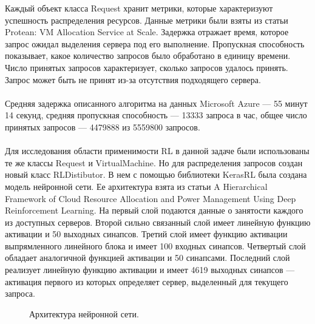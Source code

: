 \documentclass{article}
\begin{document}
Каждый объект класса Request хранит метрики, которые характеризуют успешность распределения ресурсов. Данные метрики были взяты из статьи Protean: VM Allocation Service at Scale\cite{litlink21}. Задержка отражает время, которое запрос ожидал выделения сервера под его выполнение. Пропускная способность показывает, какое количество запросов было обработано в единицу времени. Число принятых запросов характеризует, сколько запросов удалось принять. Запрос может быть не принят из-за отсутствия подходящего сервера.\\
~\\
Средняя задержка описанного алгоритма на данных Microsoft Azure — 55 минут 14 секунд, средняя пропускная способность — 13333 запроса в час, общее число принятых запросов — 4479888 из 5559800 запросов.\\
~\\
Для исследования области применимости RL в данной задаче были использованы те же классы Request и VirtualMachine. Но для распределения запросов создан новый класс RLDistibutor. В нем с помощью библиотеки KerasRL была создана модель нейронной сети. Ее архитектура взята из статьи A Hierarchical Framework of Cloud Resource Allocation and Power Management Using Deep Reinforcement Learning\cite{litlink24}. На первый слой подаются данные о занятости каждого из доступных серверов. Второй сильно связанный слой имеет линейную функцию активации и 50 выходных синапсов. Третий слой имеет функцию активации выпрямленного линейного блока и имеет 100 входных синапсов. Четвертый слой обладает аналогичной функцией активации и 50 синапсами. Последний слой реализует линейную функцию активации и имеет 4619 выходных синапсов — активация первого из которых определяет сервер, выделенный для текущего запроса.\\
\begin{figure}[h!]
\caption{Архитектура нейронной сети.}
\label{ris:image}
\end{figure}\\
\end{document}
